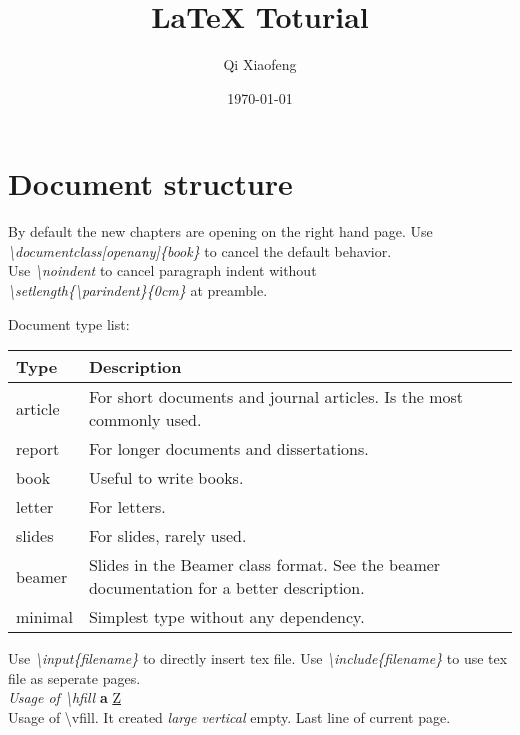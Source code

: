 \documentclass[openany]{book}
\title{LaTeX Toturial}
\author{Qi Xiaofeng}
\date{\today}
\begin{document}

\chapter{Document structure}
By default the new chapters are opening on the right hand page. Use \textit{\scriptsize\textbackslash{}documentclass[openany]\{book\}} to cancel the default behavior.\\
Use {\footnotesize\textit{\textbackslash{noindent}}} to cancel paragraph indent without\\ {\scriptsize\textit{\textbackslash{setlength\{\textbackslash{parindent}\}\{0cm\}}}} at preamble.\\

{\scriptsize
Document type list:
\begin{center}
\begin{tabular}{|l|m{6cm}|} \hline
\textbf{Type} & \textbf{Description} \\\hline
article & For short documents and journal articles. Is the most commonly used. \\\hline
report & For longer documents and dissertations. \\\hline
book & Useful to write books. \\\hline
letter & For letters. \\\hline
slides & For slides, rarely used. \\\hline
beamer & Slides in the Beamer class format. See the beamer documentation for a better description. \\\hline
minimal & Simplest type without any dependency. \\\hline
\end{tabular}
\end{center}
}

{\tiny
Use \emph{\textbackslash{input}\{filename\}} to directly insert tex file.
Use \emph{\textbackslash{include}\{filename\}} to use tex file as seperate pages.\\
}
\textit{Usage of \textbackslash{hfill}} \hfill \textbf{a} \hfill \underline{Z}\\
Usage of \textbackslash{vfill}. It created \emph{large vertical} empty.
\vfill
Last line of current page.%
\end{document}
